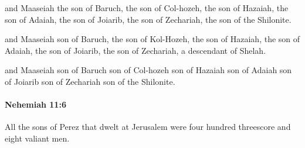 			\begin{versebox}
					\item[BHS] 
					\item[LXX] 
					\item[ASV] and Maaseiah the son of Baruch, the son of Col-hozeh, the son of Hazaiah, the son of Adaiah, the son of Joiarib, the son of Zechariah, the son of the Shilonite.
					\item[NIV] and Maaseiah son of Baruch, the son of Kol-Hozeh, the son of Hazaiah, the son of Adaiah, the son of Joiarib, the son of Zechariah, a descendant of Shelah.
					\item[NRSV] and Maaseiah son of Baruch son of Col-hozeh son of Hazaiah son of Adaiah son of Joiarib son of Zechariah son of the Shilonite.
			\end{versebox}

		\paragraph{Nehemiah 11:6} %
			\label{NEHEMIAH-11-6}

			All the sons of Perez that dwelt at Jerusalem were four hundred threescore and eight valiant men.

